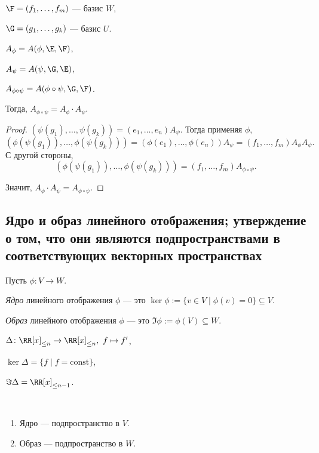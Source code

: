 $\F = (f_1, \dots, f_m)$ --- базис $W$,

$\G = (g_1, \dots, g_k)$ --- базис $U$.

$A_{\phi} = A(\phi, \E, \F)$,

$A_\psi = A(\psi, \G, \E)$,

$A_{\phi \circ \psi} = A(\phi \circ \psi, \G, \F)$.

Тогда, $A_{\phi \circ \psi} = A_\phi \cdot A_\psi$.

\begin{proof}
    $(\psi(g_1), \dots, \psi(g_k)) = (e_1, \dots, e_n) A_\psi$.
    Тогда применяя $\phi$,
    \begin{equation*}
        \left(\phi\left(\psi(g_1)\right), \dots, \phi\left(\psi(g_k)\right)\right) = \left(\phi(e_1), \dots, \phi(e_n)\right) A_\psi = (f_1, \dots, f_m) A_\phi A_\psi
    .\end{equation*}
    С другой стороны,
    \begin{equation*}
        \left(\phi\left(\psi(g_1)\right), \dots, \phi\left(\psi(g_k)\right)\right) = (f_1, \dots, f_m) A_{\phi \circ \psi}
    .\end{equation*}

    Значит, $A_\phi \cdot A_\psi = A_{\phi \circ \psi}$.
\end{proof}


\subsection{Ядро и образ линейного отображения; утверждение о том, что они являются подпространствами в соответствующих векторных пространствах}

Пусть $\phi \colon V \to W$.

\begin{definition}
    \textit{Ядро} линейного отображения $\phi$ --- это $\ker \phi := \{v \in V \mid \phi(v) = 0\} \subseteq V$.

    \textit{Образ} линейного отображения $\phi$ --- это $\Im \phi := \phi(V) \subseteq W$.
\end{definition}

\begin{example}
    $\Delta \colon \RR[x]_{\leq n} \to \RR[x]_{\leq n}, \ f \mapsto f'$,

    $\ker \Delta = \{f \mid f = \text{const}\}$,

    $\Im \Delta = \RR[x]_{\leq n - 1}$.
\end{example}

\begin{proposal}~
    \begin{enumerate}
    \item Ядро --- подпространство в $V$.
    \item Образ --- подпространство в $W$.
    \end{enumerate}
\end{proposal}

